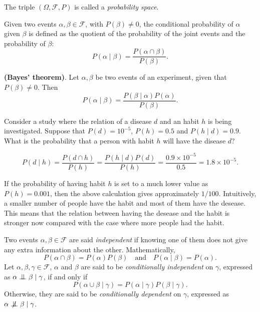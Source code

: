 The triple \((\Omega, \mathcal{F}, P)\) is called a \emph{probability space}.

\begin{definition}
  Given two events \(\alpha, \beta \in \mathcal{F}\), with \(P(\beta) \neq 0\),
  the conditional probability of \(\alpha\) given \(\beta\) is defined as the
  quotient of the probability of the joint events and the probability of
  \(\beta\):
  \[
    P(\alpha \mid \beta) = \frac{P(\alpha \cap \beta)}{P(\beta)}.
  \]
\end{definition}

\begin{theorem}
  \textbf{(Bayes' theorem)}. Let \(\alpha, \beta\) be two events of an
  experiment, given that \(P(\beta) \neq 0\). Then
  \[
  P(\alpha \mid \beta)= \frac{P(\beta \mid \alpha)P(\alpha)}{P(\beta)}.
\]
\end{theorem}

\begin{exampleth}
Consider a study where the relation of a disease \(d\) and an habit \(h\)
is being investigated. Suppose that \(P(d)=10^{-5}\), \(P(h)=0.5\) and \(P(h\mid d) = 0.9\). What is the
probability that a person with habit \(h\) will have the disease \(d\)?

\[
P(d \mid h) = \frac{P(d \cap h)}{P(h)} = \frac{P(h \mid d)P(d)}{P(h)} =
\frac{ 0.9 \times 10^{-5}}{ 0.5 } = 1.8 \times 10^{-5}.
\]

If the probability of having habit \(h\) is set to a much lower value as \(P(h) =
0.001\), then the above calculation gives approximately \(1/100\). Intuitively, a smaller number of people have the habit and most of them have the
desease. This means that the relation between having the desease and the habit
is stronger now compared with the case where more people had the habit.
\end{exampleth}

\begin{definition}
  Two events \(\alpha, \beta \in \mathcal{F}\) are said
  \emph{independent} if knowing one of them does not give any extra information
  about the other. Mathematically,
  \[
    P(\alpha \cap \beta) = P(\alpha)P(\beta) \quad \text{and} \quad P(\alpha \mid \beta) = P(\alpha).
  \]
  Let \(\alpha, \beta, \gamma \in \mathcal{F}\), \(\alpha\) and \(\beta\) are said to be
  \emph{conditionally independent} on \(\gamma\), expressed as \(\alpha \bigCI \beta \mid \gamma\),  if and only if
  \[
    P(\alpha \cup \beta \mid \gamma) = P(\alpha \mid \gamma)P(\beta \mid \gamma).
  \]
  Otherwise, they are said to be \emph{conditionally dependent} on \(\gamma\), expressed as \(\alpha \bigCD \beta \mid \gamma\).
\end{definition}

